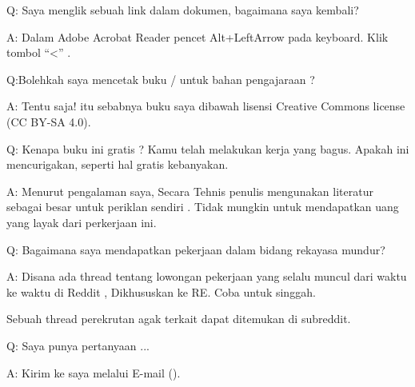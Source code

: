 \par Q: Saya menglik sebuah link dalam dokumen, bagaimana saya kembali?
\par A: Dalam Adobe Acrobat Reader pencet Alt+LeftArrow pada keyboard. Klik tombol ``<'' .

\par Q:Bolehkah saya mencetak buku / untuk bahan pengajaraan ?
\par A: Tentu saja! itu sebabnya buku saya dibawah lisensi Creative Commons license (CC BY-SA 4.0).

\par Q: Kenapa buku ini gratis ? Kamu telah melakukan kerja yang bagus. Apakah ini mencurigakan, seperti hal gratis kebanyakan.
\par A: Menurut pengalaman saya, Secara Tehnis penulis mengunakan literatur sebagai besar untuk periklan sendiri . Tidak mungkin untuk mendapatkan uang yang layak dari perkerjaan ini.

\par Q: Bagaimana saya mendapatkan pekerjaan dalam bidang rekayasa mundur?
\par A: Disana ada thread tentang lowongan pekerjaan yang selalu muncul dari waktu ke waktu di Reddit , Dikhususkan ke RE\FNURLREDDIT{}.
Coba untuk singgah.

Sebuah thread perekrutan agak terkait dapat ditemukan di  subreddit.


\par Q: Saya punya pertanyaan ...
\par A: Kirim ke saya melalui E-mail (\EMAILS).
